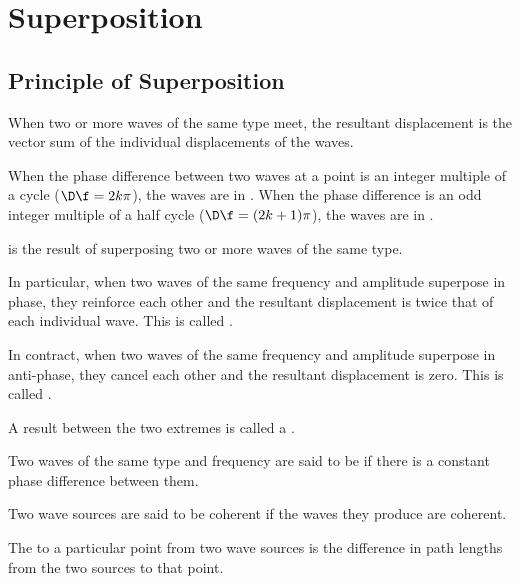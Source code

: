 \chapter{Superposition}

\section{Principle of Superposition}

\begin{principle}
    When two or more waves of the same type meet, the resultant displacement is the vector sum of the individual displacements of the waves.
\end{principle}

\begin{definition}
    When the phase difference between two waves at a point is an integer multiple of a cycle ($\D \f = 2k\pi$), the waves are in . When the phase difference is an odd integer multiple of a half cycle ($\D \f = (2k + 1)\pi$), the waves are in .
\end{definition}

\begin{definition}
     is the result of superposing two or more waves of the same type.
\end{definition}

In particular, when two waves of the same frequency and amplitude superpose in phase, they reinforce each other and the resultant displacement is twice that of each individual wave. This is called .

In contract, when two waves of the same frequency and amplitude superpose in anti-phase, they cancel each other and the resultant displacement is zero. This is called .

A result between the two extremes is called a .

\begin{definition}
    Two waves of the same type and frequency are said to be  if there is a constant phase difference between them.
\end{definition}

Two wave sources are said to be coherent if the waves they produce are coherent.

\begin{definition}
    The  to a particular point from two wave sources is the difference in path lengths from the two sources to that point.
\end{definition}

